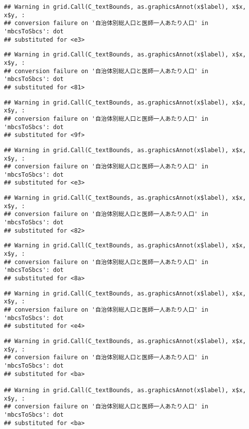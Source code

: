 \documentclass[
]{article}
\begin{document}
\begin{verbatim}
## Warning in grid.Call(C_textBounds, as.graphicsAnnot(x$label), x$x, x$y, :
## conversion failure on '自治体別総人口と医師一人あたり人口' in 'mbcsToSbcs': dot
## substituted for <e3>
\end{verbatim}

\begin{verbatim}
## Warning in grid.Call(C_textBounds, as.graphicsAnnot(x$label), x$x, x$y, :
## conversion failure on '自治体別総人口と医師一人あたり人口' in 'mbcsToSbcs': dot
## substituted for <81>
\end{verbatim}

\begin{verbatim}
## Warning in grid.Call(C_textBounds, as.graphicsAnnot(x$label), x$x, x$y, :
## conversion failure on '自治体別総人口と医師一人あたり人口' in 'mbcsToSbcs': dot
## substituted for <9f>
\end{verbatim}

\begin{verbatim}
## Warning in grid.Call(C_textBounds, as.graphicsAnnot(x$label), x$x, x$y, :
## conversion failure on '自治体別総人口と医師一人あたり人口' in 'mbcsToSbcs': dot
## substituted for <e3>
\end{verbatim}

\begin{verbatim}
## Warning in grid.Call(C_textBounds, as.graphicsAnnot(x$label), x$x, x$y, :
## conversion failure on '自治体別総人口と医師一人あたり人口' in 'mbcsToSbcs': dot
## substituted for <82>
\end{verbatim}

\begin{verbatim}
## Warning in grid.Call(C_textBounds, as.graphicsAnnot(x$label), x$x, x$y, :
## conversion failure on '自治体別総人口と医師一人あたり人口' in 'mbcsToSbcs': dot
## substituted for <8a>
\end{verbatim}

\begin{verbatim}
## Warning in grid.Call(C_textBounds, as.graphicsAnnot(x$label), x$x, x$y, :
## conversion failure on '自治体別総人口と医師一人あたり人口' in 'mbcsToSbcs': dot
## substituted for <e4>
\end{verbatim}

\begin{verbatim}
## Warning in grid.Call(C_textBounds, as.graphicsAnnot(x$label), x$x, x$y, :
## conversion failure on '自治体別総人口と医師一人あたり人口' in 'mbcsToSbcs': dot
## substituted for <ba>

## Warning in grid.Call(C_textBounds, as.graphicsAnnot(x$label), x$x, x$y, :
## conversion failure on '自治体別総人口と医師一人あたり人口' in 'mbcsToSbcs': dot
## substituted for <ba>
\end{verbatim}
\end{document}
